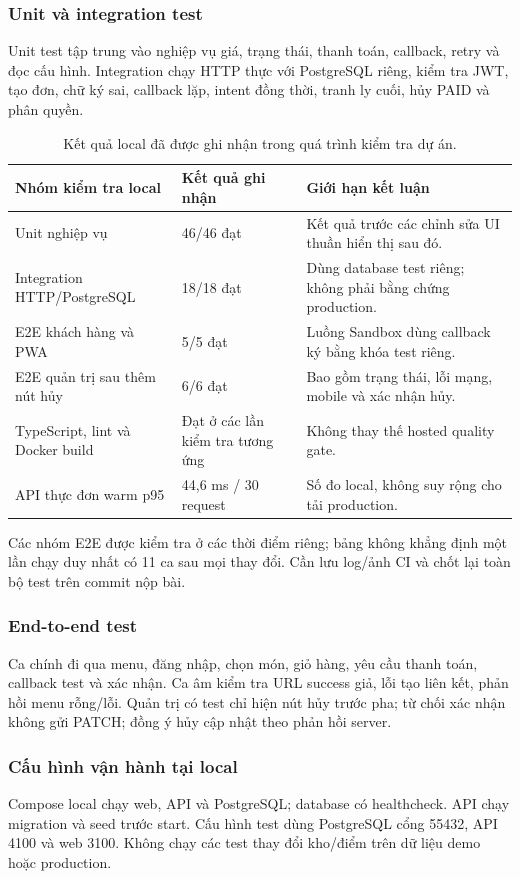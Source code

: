 \documentclass[12pt,a4paper]{article}
\begin{document}
\subsubsection{Unit và integration test}
Unit test tập trung vào nghiệp vụ giá, trạng thái, thanh toán, callback, retry và đọc cấu hình. Integration chạy HTTP thực với PostgreSQL riêng, kiểm tra JWT, tạo đơn, chữ ký sai, callback lặp, intent đồng thời, tranh ly cuối, hủy PAID và phân quyền.

\begin{table}[H]\centering\small
\begin{tabularx}{\textwidth}{P{4.0cm}P{2.4cm}Y}
\toprule\textbf{Nhóm kiểm tra local}&\textbf{Kết quả ghi nhận}&\textbf{Giới hạn kết luận}\\\midrule
Unit nghiệp vụ&46/46 đạt&Kết quả trước các chỉnh sửa UI thuần hiển thị sau đó.\\
Integration HTTP/PostgreSQL&18/18 đạt&Dùng database test riêng; không phải bằng chứng production.\\
E2E khách hàng và PWA&5/5 đạt&Luồng Sandbox dùng callback ký bằng khóa test riêng.\\
E2E quản trị sau thêm nút hủy&6/6 đạt&Bao gồm trạng thái, lỗi mạng, mobile và xác nhận hủy.\\
TypeScript, lint và Docker build&Đạt ở các lần kiểm tra tương ứng&Không thay thế hosted quality gate.\\
API thực đơn warm p95&44,6 ms / 30 request&Số đo local, không suy rộng cho tải production.\\
\bottomrule\end{tabularx}\caption{Kết quả local đã được ghi nhận trong quá trình kiểm tra dự án.}
\end{table}
Các nhóm E2E được kiểm tra ở các thời điểm riêng; bảng không khẳng định một lần chạy duy nhất có 11 ca sau mọi thay đổi. Cần lưu log/ảnh CI và chốt lại toàn bộ test trên commit nộp bài.

\subsubsection{End-to-end test}
Ca chính đi qua menu, đăng nhập, chọn món, giỏ hàng, yêu cầu thanh toán, callback test và xác nhận. Ca âm kiểm tra URL success giả, lỗi tạo liên kết, phản hồi menu rỗng/lỗi. Quản trị có test chỉ hiện nút hủy trước pha; từ chối xác nhận không gửi PATCH; đồng ý hủy cập nhật theo phản hồi server.

\subsubsection{Cấu hình vận hành tại local}
Compose local chạy web, API và PostgreSQL; database có healthcheck. API chạy migration và seed trước start. Cấu hình test dùng PostgreSQL cổng 55432, API 4100 và web 3100. Không chạy các test thay đổi kho/điểm trên dữ liệu demo hoặc production.
\end{document}
